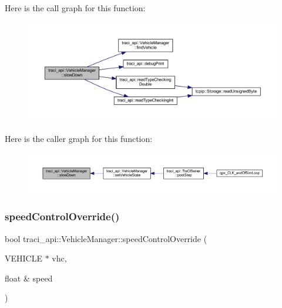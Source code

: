 Here is the call graph for this function\+:
\nopagebreak
\begin{figure}[H]
\begin{center}
\leavevmode
\includegraphics[width=350pt]{classtraci__api_1_1_vehicle_manager_afaa8625978e32aab7ca85cd52ce450a8_cgraph}
\end{center}
\end{figure}
Here is the caller graph for this function\+:
\nopagebreak
\begin{figure}[H]
\begin{center}
\leavevmode
\includegraphics[width=350pt]{classtraci__api_1_1_vehicle_manager_afaa8625978e32aab7ca85cd52ce450a8_icgraph}
\end{center}
\end{figure}
\mbox{\label{classtraci__api_1_1_vehicle_manager_acebd30eec75b857573c9237d9a15244f}} 
\subsubsection{\texorpdfstring{speed\+Control\+Override()}{speedControlOverride()}}
{\footnotesize\ttfamily bool traci\+\_\+api\+::\+Vehicle\+Manager\+::speed\+Control\+Override (\begin{DoxyParamCaption}\item[{V\+E\+H\+I\+C\+LE $\ast$}]{vhc,  }\item[{float \&}]{speed }\end{DoxyParamCaption})}




